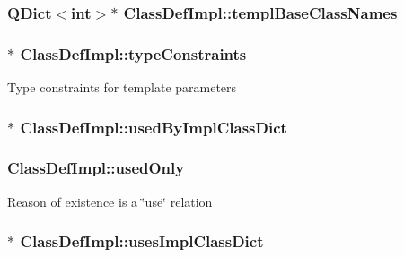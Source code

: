 \subsubsection[{templ\+Base\+Class\+Names}]{\setlength{\rightskip}{0pt plus 5cm}Q\+Dict$<$int$>$$\ast$ Class\+Def\+Impl\+::templ\+Base\+Class\+Names}\label{class_class_def_impl_af694528f58bf5c3f872e14c364dd7f89}
\hypertarget{class_class_def_impl_af0266bc567e2d9eed094e5ced846ddac}{}
\subsubsection[{type\+Constraints}]{$\ast$ Class\+Def\+Impl\+::type\+Constraints}\label{class_class_def_impl_af0266bc567e2d9eed094e5ced846ddac}
Type constraints for template parameters \hypertarget{class_class_def_impl_a578c5fd5c2fb6e5aee107a670e9e51a1}{}
\subsubsection[{used\+By\+Impl\+Class\+Dict}]{$\ast$ Class\+Def\+Impl\+::used\+By\+Impl\+Class\+Dict}\label{class_class_def_impl_a578c5fd5c2fb6e5aee107a670e9e51a1}
\hypertarget{class_class_def_impl_aef5aa0ec452605576f9a976067326e52}{}
\subsubsection[{used\+Only}]{ Class\+Def\+Impl\+::used\+Only}\label{class_class_def_impl_aef5aa0ec452605576f9a976067326e52}
Reason of existence is a \char`\"{}use\char`\"{} relation \hypertarget{class_class_def_impl_ac49d5feb5e7484ee50ae51873b8bc255}{}
\subsubsection[{uses\+Impl\+Class\+Dict}]{$\ast$ Class\+Def\+Impl\+::uses\+Impl\+Class\+Dict}\label{class_class_def_impl_ac49d5feb5e7484ee50ae51873b8bc255}
\hypertarget{class_class_def_impl_ab7e80405e26e2e111e5869c016cc9783}{}
